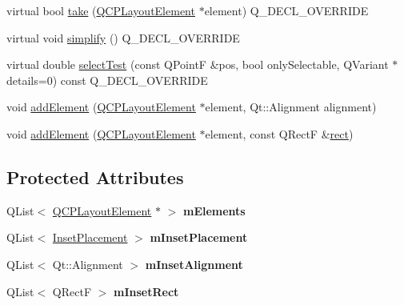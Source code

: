 \begin{DoxyCompactItemize}
\item 
virtual bool \mbox{\hyperlink{class_q_c_p_layout_inset_af7f13cc369f8190b5e7e17d5f39dfe1c}{take}} (\mbox{\hyperlink{class_q_c_p_layout_element}{Q\+C\+P\+Layout\+Element}} $\ast$element) Q\+\_\+\+D\+E\+C\+L\+\_\+\+O\+V\+E\+R\+R\+I\+DE
\item 
virtual void \mbox{\hyperlink{class_q_c_p_layout_inset_a18b7d508f0baa60cc5dcb1343cf7f32a}{simplify}} () Q\+\_\+\+D\+E\+C\+L\+\_\+\+O\+V\+E\+R\+R\+I\+DE
\item 
virtual double \mbox{\hyperlink{class_q_c_p_layout_inset_a2eeef7ea1b8340e7c7c2e2fc229df5ea}{select\+Test}} (const Q\+PointF \&pos, bool only\+Selectable, Q\+Variant $\ast$details=0) const Q\+\_\+\+D\+E\+C\+L\+\_\+\+O\+V\+E\+R\+R\+I\+DE
\item 
void \mbox{\hyperlink{class_q_c_p_layout_inset_ad61529eb576af7f04dff94abb10c745a}{add\+Element}} (\mbox{\hyperlink{class_q_c_p_layout_element}{Q\+C\+P\+Layout\+Element}} $\ast$element, Qt\+::\+Alignment alignment)
\item 
void \mbox{\hyperlink{class_q_c_p_layout_inset_a8ff61fbee4a1f0ff45c398009d9f1e56}{add\+Element}} (\mbox{\hyperlink{class_q_c_p_layout_element}{Q\+C\+P\+Layout\+Element}} $\ast$element, const Q\+RectF \&\mbox{\hyperlink{class_q_c_p_layout_element_a208effccfe2cca4a0eaf9393e60f2dd4}{rect}})
\end{DoxyCompactItemize}
\subsection*{Protected Attributes}
\begin{DoxyCompactItemize}
\item 
\mbox{\label{class_q_c_p_layout_inset_a8fff7eae9a1be9a5c1e544fb379f682f}} 
Q\+List$<$ \mbox{\hyperlink{class_q_c_p_layout_element}{Q\+C\+P\+Layout\+Element}} $\ast$ $>$ {\bfseries m\+Elements}
\item 
\mbox{\label{class_q_c_p_layout_inset_a57a0a4e445cc78eada29765ecf092abe}} 
Q\+List$<$ \mbox{\hyperlink{class_q_c_p_layout_inset_a8b9e17d9a2768293d2a7d72f5e298192}{Inset\+Placement}} $>$ {\bfseries m\+Inset\+Placement}
\item 
\mbox{\label{class_q_c_p_layout_inset_a55e9b84c310136ff985a6544184ab64a}} 
Q\+List$<$ Qt\+::\+Alignment $>$ {\bfseries m\+Inset\+Alignment}
\item 
\mbox{\label{class_q_c_p_layout_inset_aaa8f6b5029458f3d97a65239524a2b33}} 
Q\+List$<$ Q\+RectF $>$ {\bfseries m\+Inset\+Rect}
\end{DoxyCompactItemize}
